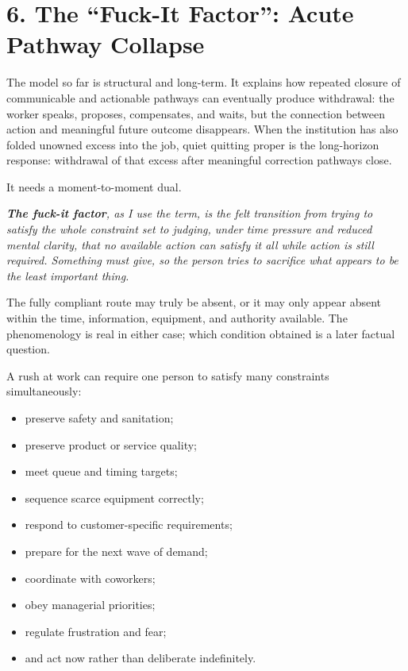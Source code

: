 \documentclass[11pt,oneside]{article}
\providecommand{\tightlist}{%
  \setlength{\itemsep}{0.22em}\setlength{\parskip}{0pt}}
\renewenvironment{quote}
  {\begin{tcolorbox}[
      enhanced,
      breakable,
      colback=ManifestLight,
      colframe=ManifestRule,
      boxrule=0pt,
      leftrule=3pt,
      arc=0pt,
      outer arc=0pt,
      left=10pt,right=10pt,top=8pt,bottom=8pt,
      before skip=0.8em,after skip=0.8em
    ]\itshape}
  {\end{tcolorbox}}
\begin{document}
\hypertarget{the-fuck-it-factor-acute-pathway-collapse}{%
\section{6. The ``Fuck-It Factor'': Acute Pathway
Collapse}\label{the-fuck-it-factor-acute-pathway-collapse}}

The model so far is structural and long-term. It explains how repeated
closure of communicable and actionable pathways can eventually produce
withdrawal: the worker speaks, proposes, compensates, and waits, but the
connection between action and meaningful future outcome disappears. When
the institution has also folded unowned excess into the job, quiet
quitting proper is the long-horizon response: withdrawal of that excess
after meaningful correction pathways close.

It needs a moment-to-moment dual.

\begin{quote}
\textbf{The fuck-it factor}, as I use the term, is the felt transition
from trying to satisfy the whole constraint set to judging, under time
pressure and reduced mental clarity, that no available action can
satisfy it all while action is still required. Something must give, so
the person tries to sacrifice what appears to be the least important
thing.
\end{quote}

The fully compliant route may truly be absent, or it may only appear
absent within the time, information, equipment, and authority available.
The phenomenology is real in either case; which condition obtained is a
later factual question.

A rush at work can require one person to satisfy many constraints
simultaneously:

\begin{itemize}
\tightlist
\item
  preserve safety and sanitation;
\item
  preserve product or service quality;
\item
  meet queue and timing targets;
\item
  sequence scarce equipment correctly;
\item
  respond to customer-specific requirements;
\item
  prepare for the next wave of demand;
\item
  coordinate with coworkers;
\item
  obey managerial priorities;
\item
  regulate frustration and fear;
\item
  and act now rather than deliberate indefinitely.
\end{itemize}
\end{document}
